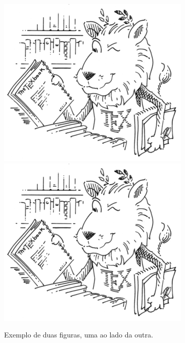 \begin{figure}[H]
    \centering
    \includegraphics[scale=0.4]{imagens/lion_large.png} \ \ \ \ \ \ \
    \includegraphics[scale=0.4]{imagens/lion_large.png}
    \caption{Exemplo de duas figuras, uma ao lado da outra.}
    \label{fig:_lado_a_lado}
\end{figure}

